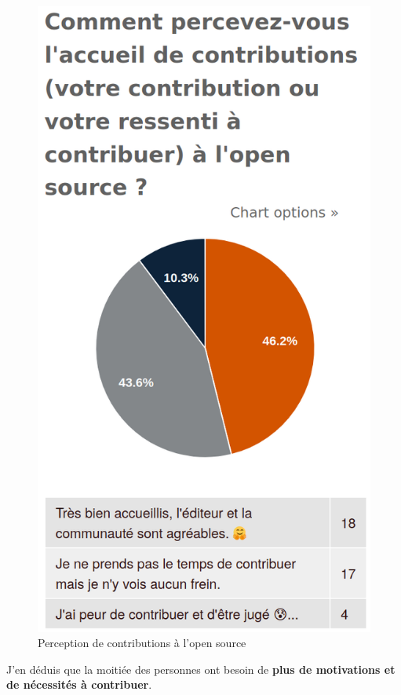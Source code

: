 			\begin{figure}[!htb]
				\center
				\includegraphics[scale=0.28]{./img/perception}
				\caption{Perception de contributions à l'open source}					
			\end{figure}

			J'en déduis que la moitiée des personnes ont besoin de \textbf{plus de motivations et de nécessités à contribuer}.\\

